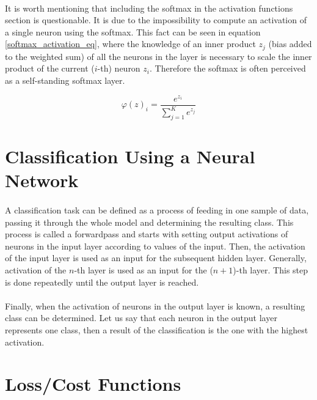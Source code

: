 \paragraph{}
It is worth mentioning that including the softmax in the activation functions section is questionable. It is due to the impossibility to compute an activation of a single neuron using the softmax. This fact can be seen in equation \ref{softmax_activation_eq}, where the knowledge of an inner product $z_j$ (bias added to the weighted sum) of all the neurons in the layer is necessary to scale the inner product of the current ($i$-th) neuron $z_i$. Therefore the softmax is often perceived as a self-standing softmax layer.

\begin{equation}
\varphi(z)_i = \frac{e^{z_i}}{\sum_{j=1}^{K} e^{z_j}}
\label{softmax_activation_eq}
\end{equation} 

\section{Classification Using a Neural Network}\label{forwardpass}
\paragraph{}
A classification task can be defined as a process of feeding in one sample of data, passing it through the whole model and determining the resulting class. This process is called a forwardpass and starts with setting output activations of neurons in the input layer according to values of the input. Then, the activation of the input layer is used as an input for the subsequent hidden layer. Generally, activation of the $n$-th layer is used as an input for the ($n+1$)-th layer. This step is done repeatedly until the output layer is reached.

\paragraph{}
Finally, when the activation of neurons in the output layer is known, a resulting class can be determined. Let us say that each neuron in the output layer represents one class, then a result of the classification is the one with the highest activation. 

\section{Loss/Cost Functions}\label{loss_function}
